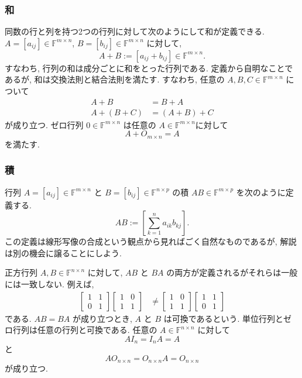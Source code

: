 \documentclass[a4paper]{scrbook}
\theoremstyle{definition}
\begin{document}
\subsubsection*{和}

同数の行と列を持つ2つの行列に対して次のようにして和が定義できる.
\(A=[a_{ij}]\in\mathbb{F}^{m\times n}\),
\(B=[b_{ij}]\in\mathbb{F}^{m\times n}\) に対して, \[
A+B:=[a_{ij}+b_{ij}]\in\mathbb{F}^{m\times n}.
\] すなわち, 行列の和は成分ごとに和をとった行列である.
定義から自明なことであるが, 和は交換法則と結合法則を満たす. すなわち,
任意の \(A,B,C\in\mathbb{F}^{m\times n}\) について \[
\begin{aligned}
A+B & =B+A\\
A+(B+C) & =(A+B)+C
\end{aligned}
\] が成り立つ. ゼロ行列 \(0\in\mathbb{F}^{m\times n}\) は任意の
\(A\in\mathbb{F}^{m\times n}\)に対して \[
  A+O_{m\times n}=A
\] を満たす.

\subsubsection*{積}

行列 \(A=[a_{ij}]\in\mathbb{F}^{m\times n}\) と
\(B=[b_{ij}]\in\mathbb{F}^{n\times p}\) の積
\(AB\in\mathbb{F}^{m\times p}\) を次のように定義する. \[
AB:=\left[\sum_{k=1}^{n}a_{ik}b_{kj}\right].
\] この定義は線形写像の合成という観点から見ればごく自然なものであるが,
解説は別の機会に譲ることにしよう.

正方行列 \(A,B\in\mathbb{F}^{n\times n}\) に対して, \(AB\) と \(BA\)
の両方が定義されるがそれらは一般には一致しない. 例えば, \[
\begin{aligned}
  \begin{bmatrix}
    1 & 1\\
    0 & 1
  \end{bmatrix}
  \begin{bmatrix}
    1 & 0\\
    1 & 1
  \end{bmatrix} 
  & \neq
  \begin{bmatrix}
    1 & 0\\
    1 & 1
  \end{bmatrix}
  \begin{bmatrix}
    1 & 1\\
    0 & 1
  \end{bmatrix}
\end{aligned}
\] である. \(AB=BA\) が成り立つとき, \(A\) と \(B\) は可換であるという.
単位行列とゼロ行列は任意の行列と可換である. 任意の
\(A\in\mathbb{F}^{n\times n}\) に対して \[
  AI_{n}=I_{n}A=A
\] と \[
  AO_{n\times n}=O_{n\times n}A=O_{n\times n}
\] が成り立つ.
\end{document}
